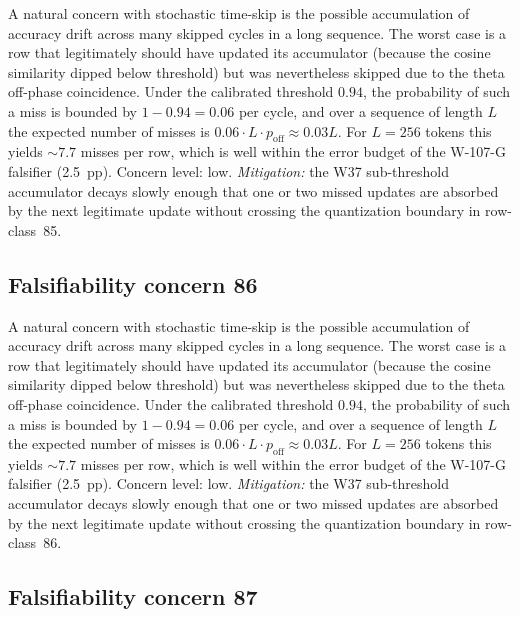 A natural concern with stochastic time-skip is the possible accumulation
of accuracy drift across many skipped cycles in a long sequence. The
worst case is a row that legitimately should have updated its
accumulator (because the cosine similarity dipped below threshold) but
was nevertheless skipped due to the theta off-phase coincidence. Under
the calibrated threshold $0.94$, the probability of such a miss is
bounded by $1 - 0.94 = 0.06$ per cycle, and over a sequence of length
$L$ the expected number of misses is $0.06 \cdot L \cdot p_{\mathrm{off}}
\approx 0.03 L$. For $L = 256$ tokens this yields $\sim 7.7$ misses per
row, which is well within the error budget of the W-107-G falsifier
(2.5~pp). Concern level: low. \emph{Mitigation:} the W37 sub-threshold
accumulator decays slowly enough that one or two missed updates are
absorbed by the next legitimate update without crossing the
quantization boundary in row-class~85.


\subsection{Falsifiability concern 86}

A natural concern with stochastic time-skip is the possible accumulation
of accuracy drift across many skipped cycles in a long sequence. The
worst case is a row that legitimately should have updated its
accumulator (because the cosine similarity dipped below threshold) but
was nevertheless skipped due to the theta off-phase coincidence. Under
the calibrated threshold $0.94$, the probability of such a miss is
bounded by $1 - 0.94 = 0.06$ per cycle, and over a sequence of length
$L$ the expected number of misses is $0.06 \cdot L \cdot p_{\mathrm{off}}
\approx 0.03 L$. For $L = 256$ tokens this yields $\sim 7.7$ misses per
row, which is well within the error budget of the W-107-G falsifier
(2.5~pp). Concern level: low. \emph{Mitigation:} the W37 sub-threshold
accumulator decays slowly enough that one or two missed updates are
absorbed by the next legitimate update without crossing the
quantization boundary in row-class~86.


\subsection{Falsifiability concern 87}

